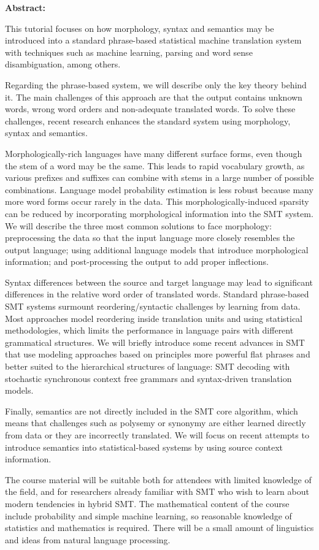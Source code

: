 \noindent
{\bfseries Abstract:} 

This tutorial focuses on how morphology, syntax and semantics may be introduced into a standard phrase-based statistical machine translation system with techniques such as machine learning, parsing and word sense disambiguation, among others.

Regarding the phrase-based system, we will describe only the key theory behind it. The main challenges of this approach are that the output contains unknown words, wrong word orders and non-adequate translated words. To solve these challenges, recent research enhances the standard system using morphology, syntax and semantics.

Morphologically-rich languages have many different surface forms, even though the stem of a word may be the same. This leads to rapid vocabulary growth, as various prefixes and suffixes can combine with stems in a large number of possible combinations. Language model probability estimation is less robust because many more word forms occur rarely in the data. This morphologically-induced sparsity can be reduced by incorporating morphological information into the SMT system. We will describe the three most common solutions to face morphology: preprocessing the data so that the input language more closely resembles the output language; using additional language models that introduce morphological information; and post-processing the output to add proper inflections.

Syntax differences between the source and target language may lead to significant differences in the relative word order of translated words. Standard phrase-based SMT systems surmount reordering/syntactic challenges by learning from data. Most approaches model reordering inside translation units and using statistical methodologies, which limits the performance in language pairs with different grammatical structures. We will briefly introduce some recent advances in SMT that use modeling approaches based on principles more powerful flat phrases and better suited to the hierarchical structures of language: SMT decoding with stochastic synchronous context free grammars and syntax-driven translation models.

Finally, semantics are not directly included in the SMT core algorithm, which means that challenges such as polysemy or synonymy are either learned directly from data or they are incorrectly translated. We will focus on recent attempts to introduce semantics into statistical-based systems by using source context information.

The course material will be suitable both for attendees with limited knowledge of the field, and for researchers already familiar with SMT who wish to learn about modern tendencies in hybrid SMT. The mathematical content of the course include probability and simple machine learning, so reasonable knowledge of statistics and mathematics is required. There will be a small amount of linguistics and ideas from natural language processing.


